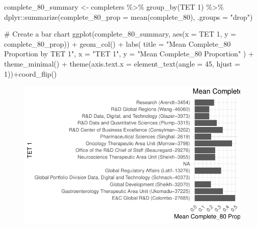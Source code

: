 \documentclass[
  letterpaper,
  DIV=11,
  numbers=noendperiod]{scrartcl}
\newenvironment{Shaded}{\begin{snugshade}}{\end{snugshade}}
\newcommand{\AttributeTok}[1]{\textcolor[rgb]{0.40,0.45,0.13}{#1}}
\newcommand{\CommentTok}[1]{\textcolor[rgb]{0.37,0.37,0.37}{#1}}
\newcommand{\DecValTok}[1]{\textcolor[rgb]{0.68,0.00,0.00}{#1}}
\newcommand{\FunctionTok}[1]{\textcolor[rgb]{0.28,0.35,0.67}{#1}}
\newcommand{\NormalTok}[1]{\textcolor[rgb]{0.00,0.23,0.31}{#1}}
\newcommand{\OtherTok}[1]{\textcolor[rgb]{0.00,0.23,0.31}{#1}}
\newcommand{\SpecialCharTok}[1]{\textcolor[rgb]{0.37,0.37,0.37}{#1}}
\newcommand{\StringTok}[1]{\textcolor[rgb]{0.13,0.47,0.30}{#1}}
\begin{document}
\begin{Shaded}
\begin{Highlighting}[]
\NormalTok{complete\_80\_summary }\OtherTok{\textless{}{-}}\NormalTok{ completers }\SpecialCharTok{\%\textgreater{}\%}
  \FunctionTok{group\_by}\NormalTok{(}\StringTok{\textasciigrave{}}\AttributeTok{TET 1}\StringTok{\textasciigrave{}}\NormalTok{) }\SpecialCharTok{\%\textgreater{}\%}
\NormalTok{  dplyr}\SpecialCharTok{::}\FunctionTok{summarize}\NormalTok{(}\AttributeTok{complete\_80\_prop =} \FunctionTok{mean}\NormalTok{(complete\_80), }\AttributeTok{.groups =} \StringTok{"drop"}\NormalTok{)}

\CommentTok{\# Create a bar chart}
\FunctionTok{ggplot}\NormalTok{(complete\_80\_summary, }\FunctionTok{aes}\NormalTok{(}\AttributeTok{x =} \StringTok{\textasciigrave{}}\AttributeTok{TET 1}\StringTok{\textasciigrave{}}\NormalTok{, }\AttributeTok{y =}\NormalTok{ complete\_80\_prop)) }\SpecialCharTok{+}
  \FunctionTok{geom\_col}\NormalTok{() }\SpecialCharTok{+}
  \FunctionTok{labs}\NormalTok{(}
    \AttributeTok{title =} \StringTok{"Mean Complete\_80 Proportion by TET 1"}\NormalTok{,}
    \AttributeTok{x =} \StringTok{"TET 1"}\NormalTok{,}
    \AttributeTok{y =} \StringTok{"Mean Complete\_80 Proportion"}
\NormalTok{  ) }\SpecialCharTok{+}
  \FunctionTok{theme\_minimal}\NormalTok{() }\SpecialCharTok{+}
  \FunctionTok{theme}\NormalTok{(}\AttributeTok{axis.text.x =} \FunctionTok{element\_text}\NormalTok{(}\AttributeTok{angle =} \DecValTok{45}\NormalTok{, }\AttributeTok{hjust =} \DecValTok{1}\NormalTok{))}\SpecialCharTok{+}\FunctionTok{coord\_flip}\NormalTok{()}
\end{Highlighting}
\end{Shaded}

\begin{figure}[H]

{\centering \includegraphics{test_files/figure-pdf/unnamed-chunk-5-1.pdf}

}

\end{figure}
\end{document}
